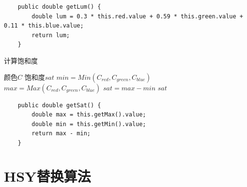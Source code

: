 \begin{lstlisting}
	public double getLum() {
		double lum = 0.3 * this.red.value + 0.59 * this.green.value + 0.11 * this.blue.value;
		return lum;
	}
\end{lstlisting}

\begin{algorithm}
	\caption{计算饱和度}
\begin{algorithmic}[1] %
	\Require  颜色$C$
	\Ensure 饱和度$sat$
	\State $min = Min(C_{red},C_{green},C_{blue})$ 
	\State$max = Max(C_{red},C_{green},C_{blue})$
	\State $sat=max-min$
	\State \Return $sat$
	\EndFunction
\end{algorithmic}
\end{algorithm}
\begin{lstlisting}
	public double getSat() {
		double max = this.getMax().value;
		double min = this.getMin().value;
		return max - min;
	}
\end{lstlisting}
\newpage 
\section{HSY替换算法}


